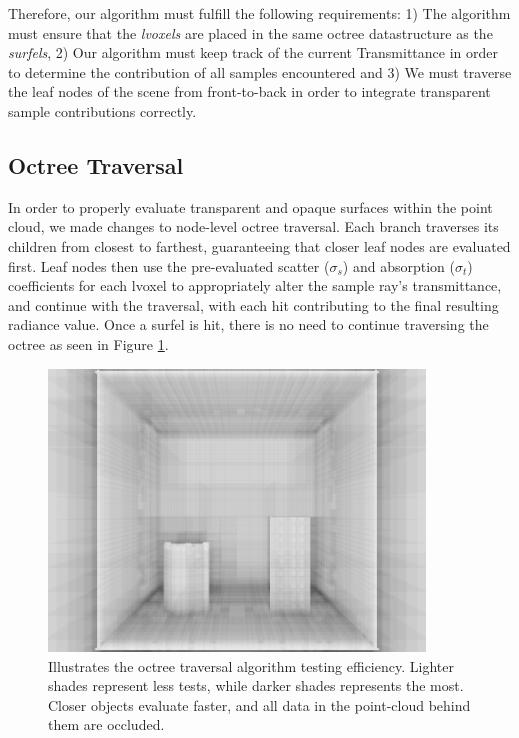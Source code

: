 \documentclass[12pt]{ucthesis}
\begin{document}
Therefore, our algorithm must fulfill the following requirements: 1) The algorithm must ensure that the \textit{lvoxels} are placed in the same octree datastructure as the \textit{surfels}, 2) Our algorithm must keep track of the current Transmittance in order to determine the contribution of all samples encountered and 3) We must traverse the leaf nodes of the scene from front-to-back in order to integrate transparent sample contributions correctly.

\subsection{Octree Traversal}

In order to properly evaluate transparent and opaque surfaces within the point cloud, we made changes to node-level octree traversal.  Each branch traverses its children from closest to farthest, guaranteeing that closer leaf nodes are evaluated first.  Leaf nodes then use the pre-evaluated scatter ($\sigma_{s}$) and absorption ($\sigma_{t}$) coefficients for each lvoxel to appropriately alter the sample ray's transmittance, and continue with the traversal, with each hit contributing to the final resulting radiance value.  Once a surfel is hit, there is no need to continue traversing the octree as seen in Figure \ref{fig:testing}.

\begin{figure}[h!]
    \centering
    \includegraphics[width=100mm]{img/testing.png}
    \caption{Illustrates the octree traversal algorithm testing efficiency.  Lighter shades represent less tests, while darker shades represents the most.  Closer objects evaluate faster, and all data in the point-cloud behind them are occluded.}
    \label{fig:testing}
\end{figure}
\end{document}
